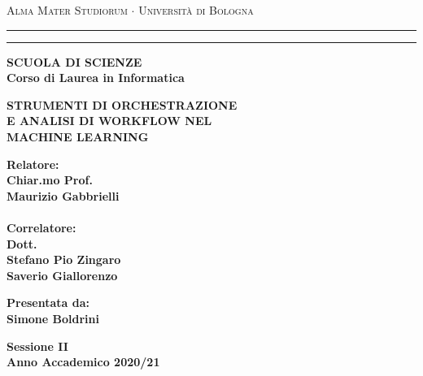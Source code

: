 \documentclass[../tesi.tex]{subfiles}
\begin{document}
\begin{titlepage}
\begin{center}
{{\Large{\textsc{Alma Mater Studiorum $\cdot$ Universit\`a di
Bologna}}}} \rule[0.1cm]{15.8cm}{0.1mm}
\rule[0.5cm]{15.8cm}{0.6mm}
{\small{\bf SCUOLA DI SCIENZE\\
Corso di Laurea in Informatica }}
\end{center}
\vspace{15mm}
\begin{center}
{\LARGE{\bf STRUMENTI DI ORCHESTRAZIONE}}\\
\vspace{3mm}
{\LARGE{\bf E ANALISI DI WORKFLOW NEL}}\\
\vspace{3mm}
{\LARGE{\bf MACHINE LEARNING}}\\
\end{center}
\vspace{40mm}
\par
\noindent
\begin{minipage}[t]{0.47\textwidth}
{\large{\bf Relatore:\\
Chiar.mo Prof.\\
Maurizio Gabbrielli}}\\
\\{\large{\bf Correlatore:\\
Dott.\\Stefano Pio Zingaro\\Saverio Giallorenzo}}
\end{minipage}
\hfill
\begin{minipage}[t]{0.47\textwidth}\raggedleft
{\large{\bf Presentata da:\\ Simone Boldrini}}
\end{minipage}
\vspace{20mm}
\begin{center}
{\large{\bf Sessione II\\
Anno Accademico 2020/21}}
\end{center}
\end{titlepage}
\end{document}
